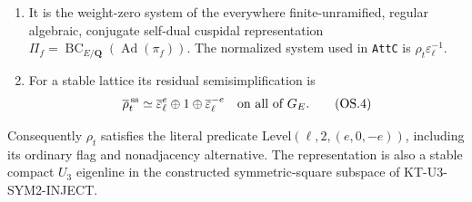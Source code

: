 \begin{theorem}
\begin{enumerate}
\item It is the weight-zero system of the everywhere
      finite-unramified, regular algebraic, conjugate
      self-dual cuspidal representation
      $\Pi_f=\operatorname{BC}_{E/\mathbf Q}
                    (\operatorname{Ad}(\pi_f))$.
      The normalized system used in \texttt{AttC} is
      $\rho_t\varepsilon_\ell^{-1}$.
\item For a stable lattice its residual semisimplification is
\[
       \overline\rho_t^{\,\rm ss}
           \simeq\overline\varepsilon_\ell^e\oplus1\oplus
                           \overline\varepsilon_\ell^{-e}
                      \quad\text{on all of }G_E.              \tag{OS.4}
\]
\end{enumerate}
Consequently $\rho_t$ satisfies the literal predicate
$\mathrm{Level}(\ell,2,(e,0,-e))$, including its ordinary
flag and nonadjacency alternative. The representation is
also a stable compact $U_3$ eigenline in the constructed
symmetric-square subspace of KT-U3-SYM2-INJECT.
\end{theorem}

